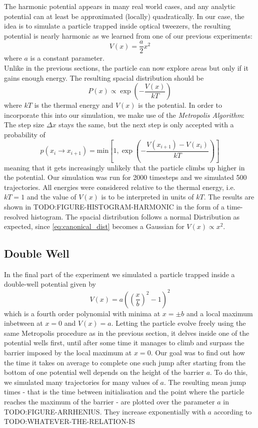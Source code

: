 \documentclass[
    parskip=half, 
    twoside=false,
    twocolumn=true,
    fontsize=11pt,
]{scrarticle}
\begin{document}
The harmonic potential appears in many real world cases, and any analytic potential can at least be approximated (locally) quadratically. In our case, the idea is to simulate a particle trapped inside optical tweezers, the resulting potential is nearly harmonic as we learned from one of our previous experiments:
\begin{equation}
 V(x) = \frac{a}{2} x^2
\end{equation}
where $a$ is a constant parameter.\\
Unlike in the previous sections, the particle can now explore areas but only if it gains enough energy. The resulting spacial distribution should be
\begin{equation}
\label{eq:canonical_dist}
 P(x) \propto \exp\left(-\frac{V(x)}{k T}\right)
\end{equation}
where $k T$ is the thermal energy and $V(x)$ is the potential. In order to incorporate this into our simulation, we make use of the \textit{Metropolis Algorithm}: The step size $\Delta x$ stays the same, but the next step is only accepted with a probability of
\begin{equation}
 p(x_i \rightarrow x_{i+1}) = \text{min}\left[1,\exp\left(-\frac{V(x_{i+1})-V(x_i)}{k T}\right)\right]
\end{equation}
meaning that it gets increasingly unlikely that the particle climbs up higher in the potential. Our simulation was run for \SI{2000}{} timesteps and we simulated \SI{500}{} trajectories. All energies were considered relative to the thermal energy, i.e. $kT=1$ and the value of $V(x)$ is to be interpreted in units of $kT$. The results are shown in TODO:FIGURE-HISTOGRAM-HARMONIC in the form of a time-resolved histogram. The spacial distribution follows a normal Distribution as expected, since \autoref{eq:canonical_dist} becomes a Gaussian for $V(x)\propto x^2$.


\subsection{Double Well}

In the final part of the experiment we simulated a particle trapped inside a double-well potential given by
\begin{equation}
 V(x) = a\left(\left(\frac{x}{b}\right)^2-1\right)^2
\end{equation}
which is a fourth order polynomial with minima at $x=\pm b$ and a local maximum inbetween at $x=0$ and $V(x)=a$. Letting the particle evolve freely using the same Metropolis procedure as in the previous section, it delves inside one of the potential wells first, until after some time it manages to climb and surpass the barrier imposed by the local maximum at $x=0$. Our goal was to find out how the time it takes on average to complete one such jump after starting from the bottom of one potential well depends on the height of the barrier $a$. To do this, we simulated many trajectories for many values of $a$. The resulting mean jump times - that is the time between initialisation and the point where the particle reaches the maximum of the barrier - are plotted over the parameter $a$ in TODO:FIGURE-ARRHENIUS. They increase exponentially with $a$ according to TODO:WHATEVER-THE-RELATION-IS
\end{document}
